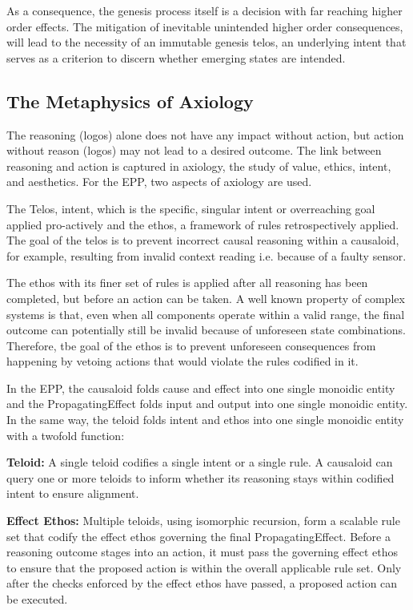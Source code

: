 As a consequence, the genesis process itself is a decision with far reaching higher order effects. The mitigation of inevitable unintended higher order consequences, will lead to the necessity of an immutable genesis telos, an underlying intent that serves as a criterion to discern whether emerging states are intended. 


\subsection{The Metaphysics of Axiology} 
\label{sec:metaphysics_axiology}

The reasoning (logos) alone does not have any impact without action, but action without reason (logos) may not lead to a desired outcome. The link between reasoning and action is captured in axiology, the study of value, ethics, intent, and aesthetics. For the EPP, two aspects of axiology are used. 

The Telos, intent, which is the specific, singular intent or overreaching goal applied pro-actively and the ethos, a framework of rules retrospectively applied. The goal of the telos is to prevent incorrect causal reasoning within a causaloid, for example, resulting from invalid context reading i.e. because of a faulty sensor. 

The ethos with its finer set of rules is applied after all reasoning has been completed, but before an action can be taken. A well known property of complex systems is that, even when all components operate within a valid range, the final outcome can potentially still be invalid because of unforeseen state combinations. Therefore, tbe goal of the ethos is to prevent unforeseen consequences from happening by vetoing actions that would violate the rules codified in it. 

In the EPP, the causaloid folds cause and effect into one single monoidic entity and the PropagatingEffect folds input and output into one single monoidic entity. In the same way, the teloid folds intent and ethos into one single monoidic entity with a twofold function:

\textbf{Teloid:} A single teloid codifies a single intent or a single rule. A causaloid can query one or more teloids to inform whether its reasoning stays within codified intent to ensure alignment. 

\textbf{Effect Ethos:} Multiple teloids, using isomorphic recursion, form a scalable rule set that codify the effect ethos governing the final PropagatingEffect. Before a reasoning outcome stages into an action, it must pass the governing effect ethos to ensure that the proposed action is within the overall applicable rule set. Only after the checks enforced by the effect ethos have passed, a proposed action can be executed. 

